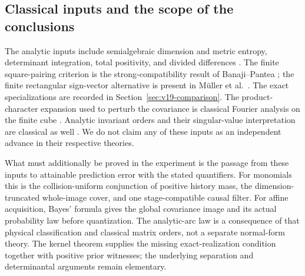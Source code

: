 \documentclass[11pt]{amsart}
\theoremstyle{definition}\newtheorem{definition}[theorem]{Definition}
\theoremstyle{remark}\newtheorem{remark}[theorem]{Remark}
\begin{document}
\subsection{Classical inputs and the scope of the conclusions}
The analytic inputs include semialgebraic dimension and metric entropy,
determinant integration, total positivity, and divided differences
\cite{BochnakCosteRoy,ForresterAndreief,Pinkus,deBoor,
YomdinComte,ZhangKileel,ComteHalupczok}. The finite square-pairing
criterion is the strong-compatibility result of Banaji--Pantea
\cite{BanajiPantea2016}; the finite rectangular sign-vector alternative
is present in M\"uller et al.\ \cite{MullerEtAl2016}. The exact
specializations are recorded in Section~\ref{sec:v19-comparison}.
The product-character expansion used to perturb the covariance is
classical Fourier analysis on the finite cube
\cite[Section 2.2]{deWolf2008}. Analytic invariant orders and their
singular-value interpretation are classical as well
\cite{KavehMakhnatch}. We do not claim any of these inputs as an
independent advance in their respective theories.

What must additionally be proved in the experiment is the passage from
these inputs to attainable prediction error with the stated quantifiers.
For monomials this is the collision-uniform conjunction of positive
history mass, the dimension-truncated whole-image cover, and one
stage-compatible causal filter. For affine acquisition, Bayes' formula
gives the global covariance image and its actual probability law before
quantization. The analytic-arc law is a consequence of that physical
classification and classical matrix orders, not a separate normal-form
theory. The kernel theorem supplies the missing exact-realization
condition together with positive prior witnesses; the underlying
separation and determinantal arguments remain elementary.
\end{document}
